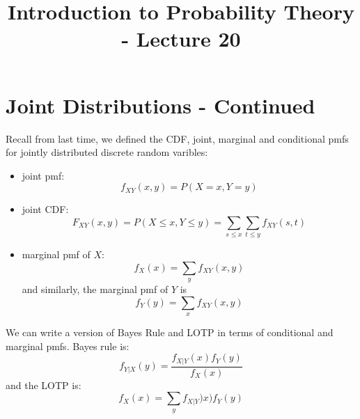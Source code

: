\documentclass[12pt]{article} %
\date{}
\title{Introduction to Probability Theory - Lecture 20}
\begin{document}
\maketitle

\section{Joint Distributions - Continued}
Recall from last time, we defined the CDF, joint, marginal and conditional pmfs for jointly distributed discrete random varibles:
\begin{itemize}
\item joint pmf: $$f_{XY}(x,y) = P(X=x,Y=y)$$
\item joint CDF: $$F_{XY}(x,y) = P(X\leq x,Y\leq y) = \sum_{s\leq x}\sum_{t\leq y} f_{XY}(s,t)$$
\item marginal pmf of $X$:
$$f_X(x) = \sum_y f_{XY}(x,y)$$
and similarly, the marginal pmf of $Y$ is
$$f_{Y}(y) = \sum_x f_{XY}(x,y)$$  
\end{itemize}

We can write a version of Bayes Rule and LOTP in terms of conditional and marginal pmfs. Bayes rule is:
$$f_{Y|X}(y) = \frac{f_{X|Y}(x) f_Y(y)}{f_X(x)}$$
and the LOTP is:
$$f_X(x) = \sum_y f_{X|Y})x) f_Y(y)$$ 
\end{document}
